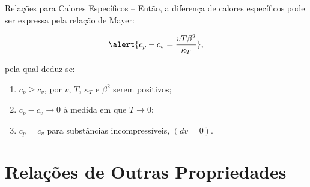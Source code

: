 \begin{frame}[allowframebreaks]{Relações para Calores Específicos --}
        \pagebreak
        Então, a diferença de calores específicos pode ser expressa pela \alert{relação de
        Mayer}:

        \begin{equation*}
            \alert{
                c_p - c_v =
                    \frac{vT\beta^2}{\kappa_T}
            },
        \end{equation*}

        \noindent pela qual deduz-se:\vspace*\medskipamount

        \begin{enumerate}
            \item \alert{$c_p \geqslant c_v$}, por $v$, $T$, $\kappa_T$ e $\beta^2$ serem
                positivos;
            \item \alert{$c_p - c_v \to 0$ à medida em que $T \to 0$};
            \item \alert{$c_p = c_v$ para substâncias incompressíveis}, $(dv = 0)$.
        \end{enumerate}

    \end{frame}

\section{Relações de Outras Propriedades}

